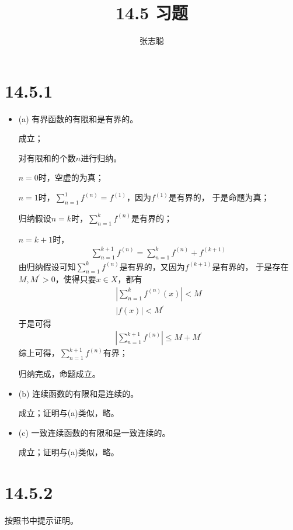 \documentclass{article}
\begin{document}
\title{14.5 习题}
\author{张志聪}
\maketitle

\section*{14.5.1}

\begin{itemize}
  \item (a) 有界函数的有限和是有界的。

        成立；

        对有限和的个数$n$进行归纳。

        $n = 0$时，空虚的为真；

        $n = 1$时，$\sum\limits_{n=1}^1 f^{(n)} = f^{(1)}$，因为$f^{(1)}$是有界的，
        于是命题为真；

        归纳假设$n = k$时，$\sum\limits_{n=1}^k f^{(n)}$是有界的；

        $n = k + 1$时，
        \begin{align*}
          \sum\limits_{n=1}^{k + 1} f^{(n)} = \sum\limits_{n=1}^k f^{(n)} + f^{(k + 1)}
        \end{align*}
        由归纳假设可知$\sum\limits_{n=1}^k f^{(n)}$是有界的，又因为$f^{(k + 1)}$是有界的，
        于是存在$M, M^\prime > 0$，使得只要$x \in X$，都有
        \begin{align*}
          |\sum\limits_{n=1}^k f^{(n)} (x)| < M \\
          |f(x)| < M^\prime
        \end{align*}
        于是可得
        \begin{align*}
          |\sum\limits_{n=1}^{k + 1} f^{(n)}| \leq M + M^\prime
        \end{align*}
        综上可得，$\sum\limits_{n=1}^{k + 1} f^{(n)}$有界；

        归纳完成，命题成立。

  \item (b) 连续函数的有限和是连续的。

        成立；证明与(a)类似，略。

  \item (c) 一致连续函数的有限和是一致连续的。

        成立；证明与(a)类似，略。
\end{itemize}

\section*{14.5.2}
按照书中提示证明。
\end{document}
